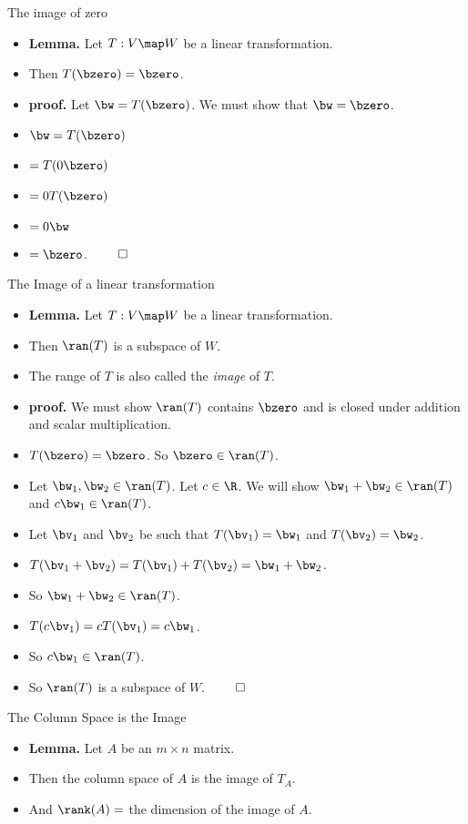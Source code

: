 \documentclass{beamer}
\begin{document}
\begin{frame}{The image of zero}

\begin{itemize}
\item \textbf{Lemma.} Let $T:V\map W$ be a linear transformation.
\item Then $T(\bzero) = \bzero$.
\item \textbf{proof.} Let $\bw = T(\bzero)$. We must show that $\bw=\bzero$.
\item $\bw = T(\bzero)$
\item $= T(0 \bzero)$
\item $= 0 T(\bzero)$
\item $= 0 \bw$
\item $= \bzero$. $\qed$
\end{itemize}

\end{frame}
\begin{frame}{The Image of a linear transformation}

\begin{itemize}
\item \textbf{Lemma.} Let $T:V\map W$ be a linear transformation.
\item Then $\ran(T)$ is a subspace of $W$.
\item The range of $T$ is also called the \emph{image} of $T$.
\item \textbf{proof.} We must show $\ran(T)$ contains $\bzero$ and is closed
under addition and scalar multiplication.
\item $T(\bzero) = \bzero$. So $\bzero\in\ran(T)$.
\item Let $\bw_1,\bw_2\in\ran(T)$. Let $c\in\R$. We will show $\bw_1+\bw_2\in\ran(T)$ and $c\bw_1\in\ran(T)$.
\item Let $\bv_1$ and $\bv_2$ be such that $T(\bv_1)=\bw_1$ and $T(\bv_2)=\bw_2$.
\item $T(\bv_1+\bv_2)=T(\bv_1) + T(\bv_2) = \bw_1+\bw_2$.
\item So $\bw_1+\bw_2\in\ran(T)$.
\item $T(c\bv_1)=cT(\bv_1)=c\bw_1$.
\item So $c\bw_1\in\ran(T)$.
\item So $\ran(T)$ is a subspace of $W$. $\qed$
\end{itemize}

\end{frame}

\begin{frame}{The Column Space is the Image}

\begin{itemize}
\item \textbf{Lemma.} Let $A$ be an $m\times n$ matrix.
\item Then the column space of $A$ is the image of $T_A$.
\item And $\rank(A) = $ the dimension of the image of $A$.
\end{itemize}

\end{frame}
\end{document}
